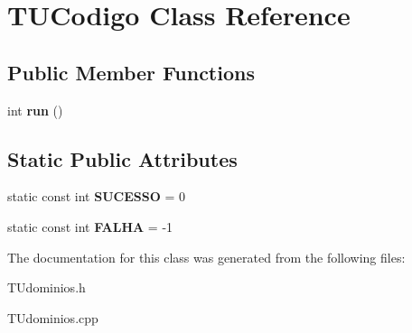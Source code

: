 \hypertarget{classTUCodigo}{}\section{T\+U\+Codigo Class Reference}
\label{classTUCodigo}
\subsection*{Public Member Functions}
\begin{DoxyCompactItemize}
\item 
\mbox{\label{classTUCodigo_a4e6994bcde0011cdf0b0bb7a2c4d94d9}} 
int {\bfseries run} ()
\end{DoxyCompactItemize}
\subsection*{Static Public Attributes}
\begin{DoxyCompactItemize}
\item 
\mbox{\label{classTUCodigo_ae74fd939ebced94047b47878406f53d1}} 
static const int {\bfseries S\+U\+C\+E\+S\+SO} = 0
\item 
\mbox{\label{classTUCodigo_abff6dd7b04006df40462c76f8b769123}} 
static const int {\bfseries F\+A\+L\+HA} = -\/1
\end{DoxyCompactItemize}


The documentation for this class was generated from the following files\+:\begin{DoxyCompactItemize}
\item 
T\+Udominios.\+h\item 
T\+Udominios.\+cpp\end{DoxyCompactItemize}
